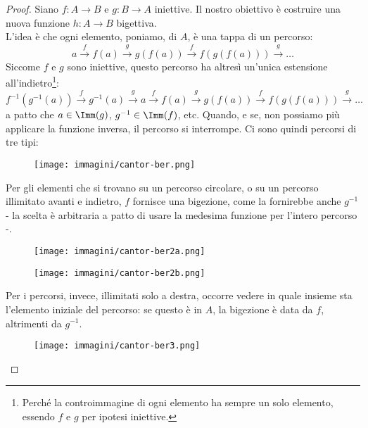 \documentclass[11pt]{scrartcl}
\begin{document}
\begin{proof}
	Siano $f: A \longrightarrow B$ e $g: B \longrightarrow A$ iniettive. Il nostro obiettivo è costruire una nuova funzione $h : A \longrightarrow B$ bigettiva.\\
	L'idea è che ogni elemento, poniamo, di $A$, è una tappa di un percorso:
	\[ a \xrightarrow{f} f(a) \xrightarrow{g} g(f(a)) \xrightarrow{f} f(g(f(a))) \xrightarrow{g} \dots
		\]
	Siccome $f$ e $g$ sono iniettive, questo percorso ha altresì un'unica estensione all'indietro\footnote{Perché la controimmagine di ogni elemento ha sempre un solo elemento, essendo $f$ e $g$ per ipotesi iniettive.}:
	\[ f^{-1}(g^{-1}(a)) \xrightarrow{f} g^{-1}(a) \xrightarrow{g} a \xrightarrow{f} f(a) \xrightarrow{g} g(f(a)) \xrightarrow{f} f(g(f(a))) \xrightarrow{g} \dots
		\]
	a patto che $a \in \Imm(g)$, $g^{-1} \in \Imm(f)$, etc. Quando, e se, non possiamo più applicare la funzione inversa, il percorso si interrompe. Ci sono quindi percorsi di tre tipi:
	\begin{center}
		\begin{figure}[h]
			\centering
			\texttt{[image: immagini/cantor-ber.png]}
		\end{figure}
	\end{center}
	Per gli elementi che si trovano su un percorso circolare, o su un percorso illimitato avanti e indietro, $f$ fornisce una bigezione, come la fornirebbe anche $g^{-1}$ - la scelta è arbitraria a patto di 
	usare la medesima funzione per l'intero percorso -.
	\begin{center}
		\begin{figure}[h]
			\centering
			\texttt{[image: immagini/cantor-ber2a.png]}
		\end{figure}
	\end{center}
	\begin{center}
		\begin{figure}[h]
			\centering
			\texttt{[image: immagini/cantor-ber2b.png]}
		\end{figure}
	\end{center}
	Per i percorsi, invece, illimitati solo a destra, occorre vedere in quale insieme sta l'elemento iniziale del percorso: se questo è in $A$, la bigezione è data da $f$,
	altrimenti da $g^{-1}$.
	\begin{center}
		\begin{figure}[h]
			\centering
			\texttt{[image: immagini/cantor-ber3.png]}
		\end{figure}
	\end{center}

\end{proof}
\end{document}
